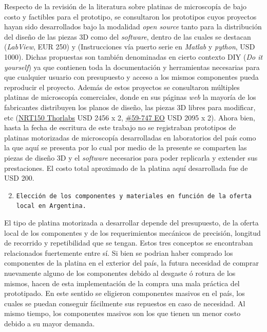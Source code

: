 Respecto de la revisión de la literatura sobre platinas de microscopía de bajo costo y factibles para el prototipo, se consultaron  los prototipos cuyos proyectos hayan sido desarrollados bajo la modalidad \textit{open source} tanto para la distribución del diseño de las piezas 3D como del \textit{software}, dentro de las cuales se destacan \cite{schaa}(\textit{LabView}, EUR 250) y \cite{campbells}(Instrucciones vía puerto serie en \textit{Matlab} y \textit{python}, USD 1000). Dichas propuestas son también denominadas en cierto contexto DIY (\textit{Do it yourself}) ya que contienen toda la documentación y herramientas necesarias para que cualquier usuario con presupuesto y acceso a los mismos componentes pueda reproducir el proyecto. Además de estos proyectos se consultaron múltiples platinas de microscopía comerciales, donde en sus páginas \textit{web} la mayoría de los fabricantes distribuyen los planos de diseño, las piezas 3D libres para modificar, etc (\href{https://www.thorlabs.com/newgrouppage9.cfm?objectgroup\_id=2132}{NRT150 Thorlabs} USD 2456 x 2, \href{https://www.edmundoptics.com/p/150mm-motorized-stage/16419/}{\#59-747 EO} USD 2095 x 2). Ahora bien, hasta la fecha de escritura de este trabajo no se registraban prototipos de platinas motorizadas de microscopía desarrolladas en laboratorios del país como la que aquí se presenta por lo cual por medio de la presente se comparten las piezas de diseño 3D y el \textit{software} necesarios para poder replicarla y extender sus prestaciones. El costo total aproximado de la platina aquí desarrollada fue de USD 200.

\begin{enumerate}
  \setcounter{enumi}{1}
  \item \texttt{Elección de los componentes y materiales en función de la oferta local en Argentina.}
\end{enumerate}

El tipo de platina motorizada a desarrollar depende del presupuesto, de la oferta local de los componentes y de los requerimientos mecánicos de precisión, longitud de recorrido y repetibilidad que se tengan. Estos tres conceptos se encontraban relacionados fuertemente entre sí. Si bien se podrian haber comprado los componentes de la platina en el exterior del país, la futura necesidad de comprar nuevamente alguno de los componentes debido al desgaste ó rotura de los mismos, hacen de esta implementación de la compra una mala práctica del prototipado. En este sentido se eligieron componentes masivos en el país, los cuales se puedan conseguir fácilmente sus repuestos en caso de necesidad. Al mismo tiempo, los componentes masivos son los que tienen un menor costo debido a su mayor demanda.


